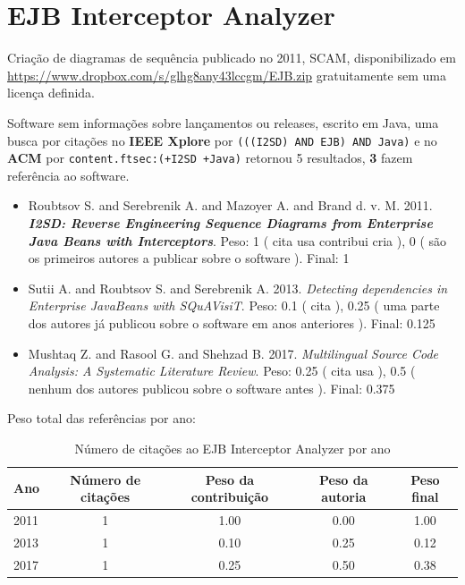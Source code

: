 \section{EJB Interceptor Analyzer}

Criação de diagramas de sequência
publicado no 2011, SCAM,
disponibilizado em \url{https://www.dropbox.com/s/glhg8any43lccgm/EJB.zip}
gratuitamente
sem uma licença definida.

Software sem informações sobre lançamentos ou releases,
escrito em Java,
uma busca por citações no {\bf IEEE Xplore} por
\texttt{(((I2SD) AND EJB) AND Java)}
e no {\bf ACM} por
\texttt{content.ftsec:(+I2SD +Java)}
retornou
5 resultados,
{\bf 3} fazem referência ao software.

\begin{itemize}
\item Roubtsov S. and Serebrenik A. and Mazoyer A. and Brand d. v. M.
      2011.
        \textbf{\textit{ I2SD: Reverse Engineering Sequence Diagrams from Enterprise Java Beans with Interceptors}}.
      Peso:
      1 (
          cita
          usa
          contribui
          cria
      ),
      0 (
são os primeiros autores a publicar sobre o software
      ).
      Final:
      1

\item Sutii A. and Roubtsov S. and Serebrenik A.
      2013.
        \textit{ Detecting dependencies in Enterprise JavaBeans with SQuAVisiT}.
      Peso:
      0.1 (
          cita
      ),
      0.25 (
uma parte dos autores já publicou sobre o software em anos anteriores
      ).
      Final:
      0.125

\item Mushtaq Z. and Rasool G. and Shehzad B.
      2017.
        \textit{ Multilingual Source Code Analysis: A Systematic Literature Review}.
      Peso:
      0.25 (
          cita
          usa
      ),
      0.5 (
nenhum dos autores publicou sobre o software antes
      ).
      Final:
      0.375

\end{itemize}

Peso total das referências por ano:

\begin{table}[h]
\caption{Número de citações ao EJB Interceptor Analyzer por ano}
\centering
\begin{tabular}{| l | c | c | c | c |}
  \hline
  Ano & Número de citações & Peso da contribuição & Peso da autoria & Peso final \\
  \hline
  2011
    & 1
    & 1.00
    & 0.00
    & 1.00 \\
  2013
    & 1
    & 0.10
    & 0.25
    & 0.12 \\
  2017
    & 1
    & 0.25
    & 0.50
    & 0.38 \\
  \hline
\end{tabular}
\end{table}


